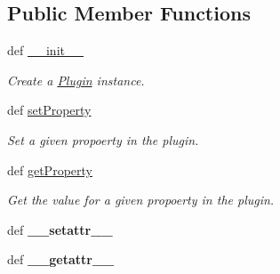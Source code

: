 \subsection*{Public Member Functions}
\begin{DoxyCompactItemize}
\item 
def \hyperlink{classpython_1_1telplugins_1_1_plugin_ac7c01bc2430411e784d753af124ebf91}{\-\_\-\-\_\-init\-\_\-\-\_\-}
\begin{DoxyCompactList}\small\item\em Create a \hyperlink{classpython_1_1telplugins_1_1_plugin}{Plugin} instance. \end{DoxyCompactList}\item 
def \hyperlink{classpython_1_1telplugins_1_1_plugin_aaa65888e8585ed3465efb885ef1a724d}{set\-Property}
\begin{DoxyCompactList}\small\item\em Set a given propoerty in the plugin. \end{DoxyCompactList}\item 
def \hyperlink{classpython_1_1telplugins_1_1_plugin_aaeaf0cdf9fd98f2386add1282e18bde3}{get\-Property}
\begin{DoxyCompactList}\small\item\em Get the value for a given propoerty in the plugin. \end{DoxyCompactList}\item 
\hypertarget{classpython_1_1telplugins_1_1_plugin_a029387a4e029c2d5740b42251696601d}{def {\bfseries \-\_\-\-\_\-setattr\-\_\-\-\_\-}}\label{classpython_1_1telplugins_1_1_plugin_a029387a4e029c2d5740b42251696601d}

\item 
\hypertarget{classpython_1_1telplugins_1_1_plugin_a39c2932fb05d2c661cf1ae7e1f5c9c18}{def {\bfseries \-\_\-\-\_\-getattr\-\_\-\-\_\-}}\label{classpython_1_1telplugins_1_1_plugin_a39c2932fb05d2c661cf1ae7e1f5c9c18}


\end{DoxyCompactItemize}
